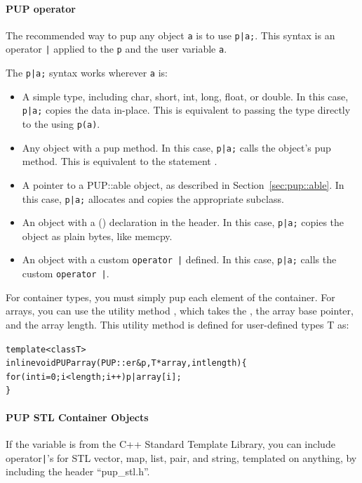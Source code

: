 \paragraph{PUP operator}
\label{sec:pupoperator}

The recommended way to pup any object \verb.a. is to use \verb.p|a;..
This syntax is an operator \verb.|. applied to the  \verb.p.
and the user variable \verb.a..

The \verb.p|a;. syntax works wherever \verb.a. is:

\begin{itemize}
 \item A simple type, including char, short, int, long, float, or double.
    In this case, \verb.p|a;. copies the data in-place.
    This is equivalent to passing the type directly to the    
       using \verb.p(a)..
 \item Any object with a pup method.
    In this case, \verb.p|a;. calls the object's pup method.
    This is equivalent to the statement . 
 \item A pointer to a PUP::able object, as described in Section~\ref{sec:pup::able}.
    In this case, \verb.p|a;. allocates and copies the appropriate subclass.
 \item An object with a () declaration in the header.
    In this case, \verb.p|a;. copies the object as plain bytes, like memcpy.
 \item An object with a custom \verb.operator |. defined.
    In this case, \verb.p|a;. calls the custom \verb.operator |..
\end{itemize}



For container types, you must simply pup each element of the container.
For arrays, you can use the utility method , which takes
the , the array base pointer, and the array length.
This utility method is defined for user-defined types T as:
  \begin{alltt}
    template<class T>
    inline void PUParray(PUP::er &p,T *array,int length) \{
       for (int i=0;i<length;i++) p|array[i];
    \}
  \end{alltt}

\paragraph{PUP STL Container Objects}
\label{sec:pupstl}
If the variable is from the C++ Standard Template Library, you can include 
operator\verb.|.'s for STL vector, map, list, pair, and string, templated
on anything, by including the header ``pup\_stl.h''.

